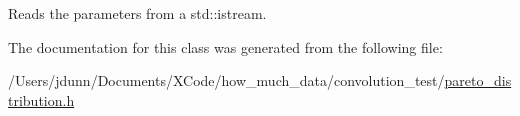 Reads the parameters from a std\+::istream. 



The documentation for this class was generated from the following file\+:\begin{DoxyCompactItemize}
\item 
/\+Users/jdunn/\+Documents/\+X\+Code/how\+\_\+much\+\_\+data/convolution\+\_\+test/\mbox{\hyperlink{pareto__distribution_8h}{pareto\+\_\+distribution.\+h}}\end{DoxyCompactItemize}
